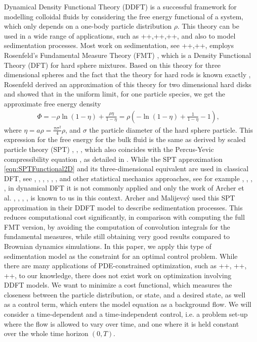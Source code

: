 \documentclass[final]{siamltex}
\begin{document}
Dynamical Density Functional Theory (DDFT) is a successful framework for modelling colloidal fluids by considering the free energy functional of a system, which only depends on a one-body particle distribution $\rho$. This theory can be used in a wide range of applications, such as ++,++,++, and also to model sedimentation processes. Most work on sedimentation, see ++,++, employs Rosenfeld's Fundamental Measure Theory (FMT) \cite{RosenfeldFMT}, which is a Density Functional Theory (DFT) for hard sphere mixtures.
Based on this theory for three dimensional spheres and the fact that the theory for hard rods is known exactly \cite{Percus1976}, Rosenfeld \cite{Rosenfeld2DInterp} derived an approximation of this theory for two dimensional hard disks and showed that in the uniform limit, for one particle species, we get the approximate free energy density
\begin{align} \label{eqn:SPTFunctional2D}
	\Phi = - \rho \ln (1- \eta) + \frac{\rho \eta}{1 - \eta} = \rho \left(-\ln(1-\eta) + \frac{1}{1- \eta} -1 \right),
\end{align} 
where $\eta = a \rho = \frac{\pi \sigma^2}{4} \rho$, and $\sigma$ the particle diameter of the hard sphere particle.
This expression for the free energy for the bulk fluid is the same as derived by scaled particle theory (SPT) \cite{Reiss1959}, \cite{Reiss1960}, \cite{Helfand1961}, which also coincides with the Percus-Yevic compressibility equation \cite{PercusYevick1}, as detailed in \cite{RosenfeldSPT}.
While the SPT approximation \eqref{eqn:SPTFunctional2D} and its three-dimensional equivalent are used in classical DFT, see \cite{DFTWinkelmann2001}, \cite{DFTRoth1}, \cite{DFTRoth2}, \cite{DFTGonzalez1997}, \cite{DFTCuesta2008}, \cite{DFTLoewen2002}, and other statistical mechanics approaches, see for example \cite{GrafLoewen1999}, \cite{DuBois2002}, \cite{Chamoux1998}, \cite{Chamoux1996}, in dynamical DFT it is not commonly applied and only the work of Archer et al. \cite{ArcherSed1}, \cite{ArcherSed2008}, \cite{ArcherSed2011}, \cite{ArcherSed2013}, is known to us in this context. Archer and Malijevs\'y \cite{ArcherSed1} used this SPT approximation in their DDFT model to describe sedimentation processes. This reduces computational cost significantly, in comparison with computing the full FMT version, by avoiding the computation of convolution integrals for the fundamental measures, while still obtaining very good results compared to Brownian dynamics simulations. 
In this paper, we apply this type of sedimentation model as the constraint for an optimal control problem. While there are many applications of PDE-constrained optimization, such as ++, ++, ++, to our knowledge, there does not exist work on optimization involving DDFT models. We want to minimize a cost functional, which measures the closeness between the particle distribution, or state, and a desired state, as well as a control term, which enters the model equation as a background flow. We will consider a time-dependent and a time-independent control, i.e. a problem set-up where the flow is allowed to vary over time, and one where it is held constant over the whole time horizon $(0,T)$.  
\end{document}
